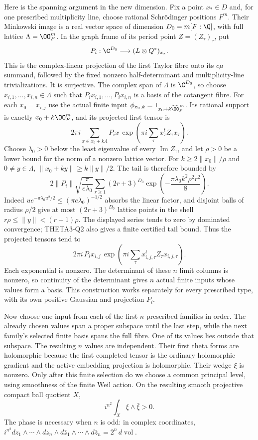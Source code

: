 Here is the spanning argument in the new dimension. Fix a point
$x_*\in D$ and, for one prescribed multiplicity line, choose rational
Schr\"odinger positions $F^m$. Their Minkowski image is a real vector
space of dimension $D_0=m[F:\Q]$, with full lattice
$\Lambda=\OO_F^m$. In the graph frame of its period point
$Z=(Z_\tau)_\tau$, put
\[
 P_i:\C^{D_0}\longrightarrow
       (L\otimes Q^*)_{x_*}.
\]
This is the complex-linear projection of the first Taylor fibre
onto its $c\mu$ summand, followed by the fixed nonzero
half-determinant and multiplicity-line trivializations. It is
surjective. The complex span of $\Lambda$ is $\C^{D_0}$, so choose
$x_{i,1},\ldots,x_{i,n}\in\Lambda$ such that
$P_i x_{i,1},\ldots,P_i x_{i,n}$ is a basis of the cotangent fibre.
For each $x_0=x_{i,j}$ use the actual finite input
$\phi_{x_0,k}=1_{x_0+k\widehat{\OO}_F^{\,m}}$. Its rational
support is exactly $x_0+k\OO_F^m$, and its projected first tensor is
\[
 2\pi i\sum_{x\in x_0+k\Lambda}
       P_i x\,
       \exp\left(\pi i\sum_\tau x_\tau^tZ_\tau x_\tau\right).
\]
Choose $\lambda_0>0$ below the least eigenvalue of every
$\operatorname{Im}Z_\tau$, and let $\rho>0$ be a lower bound for
the norm of a nonzero lattice vector. For
$k\geq2\|x_0\|/\rho$ and $0\ne y\in\Lambda$,
$\|x_0+ky\|\geq k\|y\|/2$. The tail is therefore bounded by
\[
 2\|P_i\|\sqrt{\frac{\pi}{e\lambda_0}}
   \sum_{r\geq1}(2r+3)^{D_0}
      \exp\left(-\frac{\pi\lambda_0 k^2\rho^2 r^2}{8}\right).
\]
Indeed $u e^{-\pi\lambda_0u^2/2}\leq
(\pi e\lambda_0)^{-1/2}$ absorbs the linear factor, and disjoint
balls of radius $\rho/2$ give at most $(2r+3)^{D_0}$ lattice
points in the shell $r\rho\leq\|y\|<(r+1)\rho$.
The displayed series tends to zero by dominated convergence;
THETA3-Q2 also gives a finite certified tail bound. Thus the
projected tensors tend to
\[
 2\pi i\,P_i x_{i,j}\,
 \exp\left(\pi i\sum_\tau
              x_{i,j,\tau}^tZ_\tau x_{i,j,\tau}\right).
\]
Each exponential is nonzero. The determinant of these $n$ limit
columns is nonzero, so continuity of the determinant gives $n$
actual finite inputs whose values form a basis. This construction
works separately for every prescribed type, with its own positive
Gaussian and projection $P_i$.

Now choose one input from each of the first $n$ prescribed families
in order. The already chosen values span a proper subspace until
the last step, while the next family's selected finite basis spans
the full fibre. One of its values lies outside that subspace.
The resulting $n$ values are independent. Their first theta forms
are holomorphic because the first completed tensor is the ordinary
holomorphic gradient and the active embedding projection is
holomorphic. Their wedge $\xi$ is nonzero. Only after this finite
selection do we choose a common principal level, using smoothness
of the finite Weil action. On the resulting smooth projective
compact ball quotient $X$,
\begin{equation}\label{A6-positive}
 i^{n^2}\int_X\xi\wedge\bar\xi>0.
\end{equation}
The phase is necessary when $n$ is odd: in complex coordinates,
$i^{n^2}dz_1\wedge\cdots\wedge dz_n\wedge
d\bar z_1\wedge\cdots\wedge d\bar z_n=2^n\,d\operatorname{vol}$.

